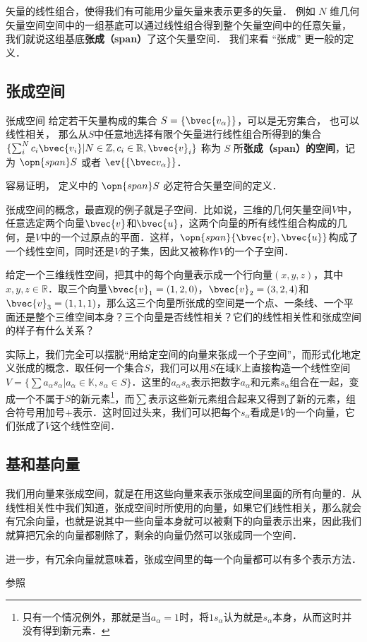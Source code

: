 

矢量的线性组合，使得我们有可能用少量矢量来表示更多的矢量． 例如 $N$ 维几何矢量空间空间中的一组基底可以通过线性组合得到整个矢量空间中的任意矢量， 我们就说这组基底\textbf{张成（span）}了这个矢量空间． 我们来看 “张成” 更一般的定义．

\subsection{张成空间}

\begin{definition}{张成空间}
给定若干矢量构成的集合 $S=\{\bvec{v_\alpha}\}$，可以是无穷集合， 也可以线性相关， 那么从$S$中任意地选择有限个矢量进行线性组合所得到的集合 $\{\sum_i^N c_i\bvec{v_i}|N\in\mathbb{Z}, c_i\in\mathbb{R}, \bvec{v}_i\}$ 称为 $S$ 所\textbf{张成（span）的空间}，记为 $\opn{span} S$ 或者 $\ev{\{\bvec v_\alpha\}}$．
\end{definition}
容易证明， 定义中的 $\opn{span} S$ 必定符合矢量空间的定义．

张成空间的概念，最直观的例子就是子空间．比如说，三维的几何矢量空间$V$中，任意选定两个向量$\bvec{v}$和$\bvec{u}$，这两个向量的所有线性组合构成的几何，是$V$中的一个过原点的平面．这样，$\opn{span}\{\bvec{v}, \bvec{u}\}$构成了一个线性空间，同时还是$V$的子集，因此又被称作$V$的一个子空间．

\begin{exercise}{}\label{VecSpn_exe1}
给定一个三维线性空间，把其中的每个向量表示成一个行向量$(x,y,z)$，其中$x,y,z\in\mathbb{R}$．取三个向量$\bvec{v}_1=(1,2,0)$，$\bvec{v}_2=(3,2,4)$和$\bvec{v}_3=(1,1,1)$，那么这三个向量所张成的空间是一个点、一条线、一个平面还是整个三维空间本身？三个向量是否线性相关？它们的线性相关性和张成空间的样子有什么关系？
\end{exercise}

实际上，我们完全可以摆脱“用给定空间的向量来张成一个子空间”，而形式化地定义张成的概念．取任何一个集合$S$，我们可以用$S$在域$\mathbb{K}$上直接构造一个线性空间$V=\{\sum a_\alpha s_\alpha|a_\alpha\in\mathbb{K}, s_\alpha\in S\}$．这里的$a_\alpha s_\alpha$表示把数字$a_\alpha$和元素$s_\alpha$组合在一起，变成一个不属于$S$的新元素\footnote{只有一个情况例外，那就是当$a_\alpha=1$时，将$1s_\alpha$认为就是$s_\alpha$本身，从而这时并没有得到新元素．}，而$\sum$表示这些新元素组合起来又得到了新的元素，组合符号用加号$+$表示．这时回过头来，我们可以把每个$s_\alpha$看成是$V$的一个向量，它们张成了$V$这个线性空间．

\subsection{基和基向量}

我们用向量来张成空间，就是在用这些向量来表示张成空间里面的所有向量的．从线性相关性中我们知道，张成空间时所使用的向量，如果它们线性相关，那么就会有冗余向量，也就是说其中一些向量本身就可以被剩下的向量表示出来，因此我们就算把冗余的向量都剔除了，剩余的向量仍然可以张成同一个空间．

进一步，有冗余向量就意味着，张成空间里的每一个向量都可以有多个表示方法．

\begin{exercise}{}
参照
\end{exercise}


